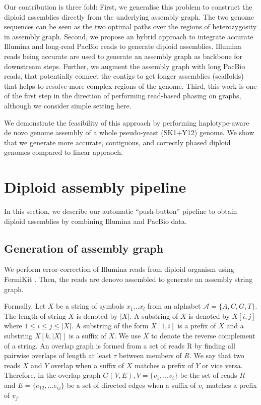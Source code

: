 Our contribution is three fold: First, we generalise this problem to construct the diploid assemblies directly from the underlying assembly graph.
The two genome sequences can be seen as the two optimal paths over the regions of heterozygosity in assembly graph.
Second, we propose an hybrid approach to integrate accurate Illumina and long-read PacBio reads to generate diploid assemblies. 
Illumina reads being accurate are used to generate an assembly graph as backbone for downstream steps.
Further, we augment the assembly graph with long PacBio reads, that potentially connect the contigs to get longer assemblies (scaffolds) that helps to resolve more complex regions of the genome.
Third, this work is one of the first step in the direction of performing read-based phasing on graphs, although we consider simple setting here.

We demonstrate the feasibility of this approach by performing haplotype-aware de novo genome assembly of a whole pseudo-yeast (SK1+Y12) genome.
We show that we generate more accurate, contiguous, and correctly phased diploid genomes compared to linear appraoch.


\section{Diploid assembly pipeline}
In this section, we describe our automatic ``push-button'' pipeline to obtain diploid assemblies by combining Illumina and PacBio data.

\subsection{Generation of assembly graph} We perform error-correction of Illumina reads from diploid organism using FermiKit \citep{ ...}.
Then, the reads are denovo assembled to generate an assembly string graph. 
\begin{definition}
Formally, Let $X$ be a string of symbols $x_1 \ldots x_l$ from an alphabet $\mathcal{A} = \{A,C,G,T\}$. 
The length of string $X$ is denoted by $|X|$. A substring of $X$ is denoted by $X[i,j]$ where $1 \le i \le j\le |X|$. 
A substring of the form $X[1, i]$ is a prefix of $X$ and a substring $X[k, |X|]$ is a suffix of $X$. We use $\overline{X}$ to denote the reverse complement of a string.
An overlap graph is formed from a set of reads R by finding all pairwise overlaps of length at least $\tau$ between members of $R$.
We say that two reads $X$ and $Y$ overlap when a suffix of $X$ matches a prefix of $Y$ or vice versa. Therefore, in the overlap graph $G(V,E), V = \{v_1, \ldots v_i\}$ be the set of reads $R$ and $E =\{e_{12}, \ldots e_{ij}\}$ be a set of directed edges  when a suffix of $v_i$ matches a prefix of $v_j$.
\end{definition}

